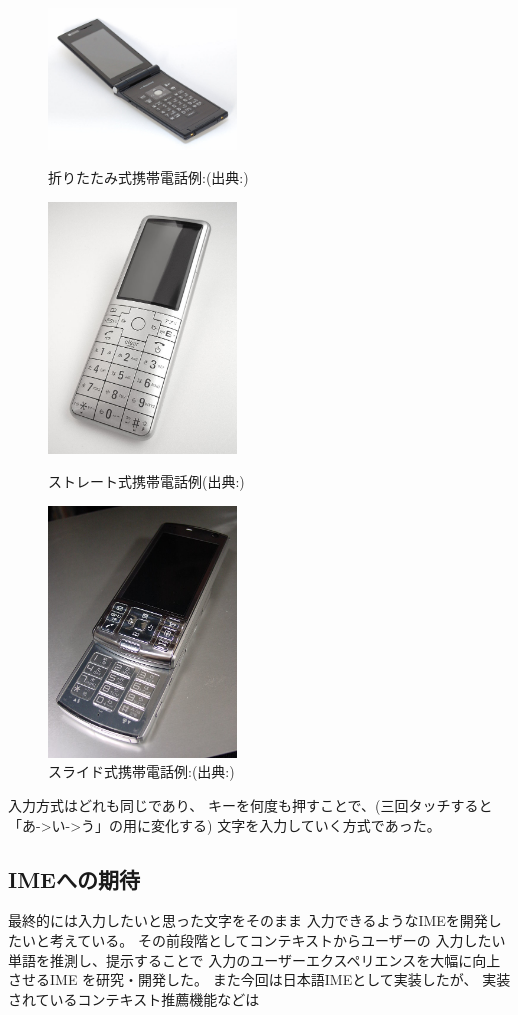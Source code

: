 \begin{figure}[htbp]
  \begin{minipage}{0.3\hsize}
    \begin{center}
      \includegraphics[width=50mm,bb=0 0 1024 768]{images/oritatami.png}
    \end{center}
    \caption{折りたたみ式携帯電話例:(出典:\cite{keitai})}
    \label{fig:oritatami}
  \end{minipage}
  \begin{minipage}{0.3\hsize}
    \begin{center}
      \includegraphics[width=50mm,bb=0 0 147 196]{images/straight.png}
    \end{center}
    \caption{ストレート式携帯電話例(出典:\cite{keitai})}
    \label{fig:straight}
  \end{minipage}
  \begin{minipage}{0.3\hsize}
    \begin{center}
      \includegraphics[width=50mm,bb=0 0 154 205]{images/slide.png}
    \end{center}
    \caption{スライド式携帯電話例:(出典:\cite{keitai})}
    \label{fig:slide}
  \end{minipage}
\end{figure}
入力方式はどれも同じであり、
キーを何度も押すことで、(三回タッチすると「あ->い->う」の用に変化する)
文字を入力していく方式であった。

\subsection{IMEへの期待}
最終的には入力したいと思った文字をそのまま
入力できるようなIMEを開発したいと考えている。
その前段階としてコンテキストからユーザーの
入力したい単語を推測し、提示することで
入力のユーザーエクスペリエンスを大幅に向上させるIME
を研究・開発した。
また今回は日本語IMEとして実装したが、
実装されているコンテキスト推薦機能などは

